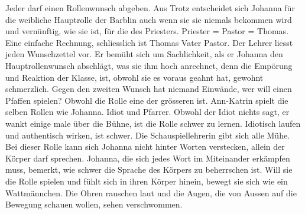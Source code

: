 Jeder darf einen Rollenwunsch abgeben. Aus Trotz entscheidet sich Johanna für die weibliche Hauptrolle der Barblin auch wenn sie sie niemals bekommen wird und vernünftig, wie sie ist, für die des Priesters. Priester = Pastor = Thomas. Eine einfache Rechnung, schliesslich ist Thomas Vater Pastor.
Der Lehrer liesst jeden Wunschzettel vor. Er bemüht sich um Sachlichkeit, als er Johanna den Hauptrollenwunsch abschlägt, was sie ihm hoch anrechnet, denn die Empörung und Reaktion der Klasse, ist, obwohl sie es voraus geahnt hat, gewohnt schmerzlich.
Gegen den zweiten Wunsch hat niemand Einwände, wer will einen Pfaffen spielen? Obwohl die Rolle eine der grösseren ist. Ann-Katrin spielt die selben Rollen wie Johanna. Idiot und Pfarrer.
Obwohl der Idiot nichts sagt, er wankt einige male über die Bühne, ist die Rolle schwer zu lernen. Idiotisch laufen und authentisch wirken, ist schwer. Die Schauspiellehrerin gibt sich alle Mühe. Bei dieser Rolle kann sich Johanna nicht hinter Worten verstecken, allein der Körper darf sprechen. Johanna, die sich jedes Wort im Miteinander erkämpfen muss, bemerkt, wie schwer die Sprache des Körpers zu beherrschen ist. Will sie die Rolle spielen und fühlt sich in ihren Körper hinein, bewegt sie sich wie ein Wattmännchen. Die Ohren rauschen laut und die Augen, die von Aussen auf die Bewegung schauen wollen, sehen verschwommen. 

